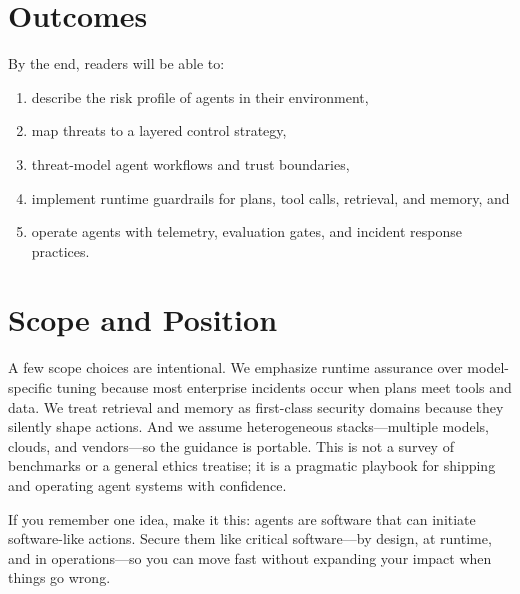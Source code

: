 \begin{TNtwocol}
  \section*{Outcomes}
  By the end, readers will be able to:
  \begin{enumerate}
    \item describe the risk profile of agents in their environment,
    \item map threats to a layered control strategy,
    \item threat-model agent workflows and trust boundaries,
    \item implement runtime guardrails for plans, tool calls, retrieval, and memory, and
    \item operate agents with telemetry, evaluation gates, and incident response practices.
  \end{enumerate}

  \section*{Scope and Position}
  A few scope choices are intentional. We emphasize runtime assurance over model-specific tuning because most enterprise incidents occur when plans meet tools and data. We treat retrieval and memory as first-class security domains because they silently shape actions. And we assume heterogeneous stacks---multiple models, clouds, and vendors---so the guidance is portable. This is not a survey of benchmarks or a general ethics treatise; it is a pragmatic playbook for shipping and operating agent systems with confidence.

  If you remember one idea, make it this: agents are software that can initiate software-like actions. Secure them like critical software---by design, at runtime, and in operations---so you can move fast without expanding your impact when things go wrong.





\end{TNtwocol}
